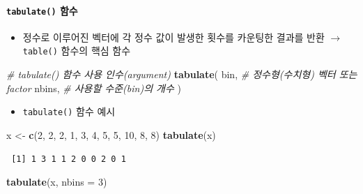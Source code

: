 \documentclass[
  11pt,
]{krantz}
\newenvironment{Shaded}{\begin{snugshade}}{\end{snugshade}}
\newcommand{\CommentTok}[1]{\textcolor[rgb]{0.37,0.37,0.37}{\textit{#1}}}
\newcommand{\DataTypeTok}[1]{\textcolor[rgb]{0.27,0.27,0.27}{#1}}
\newcommand{\DecValTok}[1]{\textcolor[rgb]{0.06,0.06,0.06}{#1}}
\newcommand{\KeywordTok}[1]{\textcolor[rgb]{0.27,0.27,0.27}{\textbf{#1}}}
\newcommand{\NormalTok}[1]{#1}
\newcommand{\StringTok}[1]{\textcolor[rgb]{0.5,0.5,0.5}{#1}}
\providecommand{\tightlist}{%
  \setlength{\itemsep}{0pt}\setlength{\parskip}{0pt}}
\begin{document}
\hypertarget{tab-fun1}{%
\paragraph{\texorpdfstring{\texttt{tabulate()} 함수}{tabulate() 함수}}\label{tab-fun1}}

\begin{itemize}
\tightlist
\item
  정수로 이루어진 벡터에 각 정수 값이 발생한 횟수를 카운팅한 결과를 반환 \(\rightarrow\) \texttt{table()} 함수의 핵심 함수
\end{itemize}

\footnotesize

\begin{Shaded}
\begin{Highlighting}[]
\CommentTok{# tabulate() 함수 사용 인수(argument)}
\KeywordTok{tabulate}\NormalTok{(}
\NormalTok{  bin,  }\CommentTok{# 정수형(수치형) 벡터 또는 factor }
\NormalTok{  nbins, }\CommentTok{# 사용할 수준(bin)의 개수 }
\NormalTok{)}
\end{Highlighting}
\end{Shaded}

\normalsize

\begin{itemize}
\tightlist
\item
  \texttt{tabulate()} 함수 예시
\end{itemize}

\footnotesize

\begin{Shaded}
\begin{Highlighting}[]
\NormalTok{x <-}\StringTok{ }\KeywordTok{c}\NormalTok{(}\DecValTok{2}\NormalTok{, }\DecValTok{2}\NormalTok{, }\DecValTok{2}\NormalTok{, }\DecValTok{1}\NormalTok{, }\DecValTok{3}\NormalTok{, }\DecValTok{4}\NormalTok{, }\DecValTok{5}\NormalTok{, }\DecValTok{5}\NormalTok{, }\DecValTok{10}\NormalTok{, }\DecValTok{8}\NormalTok{, }\DecValTok{8}\NormalTok{)}
\KeywordTok{tabulate}\NormalTok{(x)}
\end{Highlighting}
\end{Shaded}

\begin{verbatim}
 [1] 1 3 1 1 2 0 0 2 0 1
\end{verbatim}

\begin{Shaded}
\begin{Highlighting}[]
\KeywordTok{tabulate}\NormalTok{(x, }\DataTypeTok{nbins =} \DecValTok{3}\NormalTok{)}
\end{Highlighting}
\end{Shaded}
\end{document}
